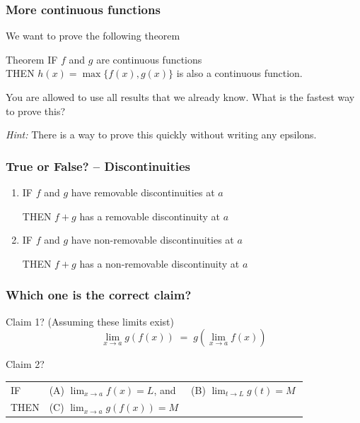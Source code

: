 \begin{frame}
	\frametitle{More continuous functions}

	We want to prove the following theorem
	\begin{block}{Theorem}
		IF $f$ and $g$ are continuous functions \\ THEN $h(x) = \max \{ f(x), g(x) \}$
		is also a continuous function.
	\end{block}

	You are allowed to use all results that we already know. What is the fastest
	way to prove this?

	\vfill

	\emph{Hint:} There is a way to prove this quickly without writing any epsilons.

	\vfill
\end{frame}

\begin{frame}
	\frametitle{True or False? -- Discontinuities}

	\begin{enumerate}
		\item IF $f$ and $g$ have removable discontinuities at $a$

			THEN $f+g$ has a removable discontinuity at $a$

		\item IF $f$ and $g$ have non-removable discontinuities at $a$

			THEN $f+g$ has a non-removable discontinuity at $a$
	\end{enumerate}
\end{frame}

\begin{frame}
	\frametitle{Which one is the correct claim?}

	\begin{block}{Claim 1?}
		(Assuming these limits exist)
		\[
			\lim_{x \to a}g(f(x)) \; = \; g \left( \lim_{x \to a}f(x) \right)
		\]
	\end{block}

	\vfill

	\begin{block}{Claim 2?}
		\begin{tabular}{lll}
			IF   & {\color{blue} (A)} $\displaystyle \lim_{x \to a}f(x) = L$, \quad and & {\color{blue} (B)} $\displaystyle \lim_{t \to L}g(t) = M \ $ \\
			THEN & {\color{blue} (C)} $\displaystyle \lim_{x \to a}g(f(x)) = M \;$
		\end{tabular}
	\end{block}
\end{frame}

